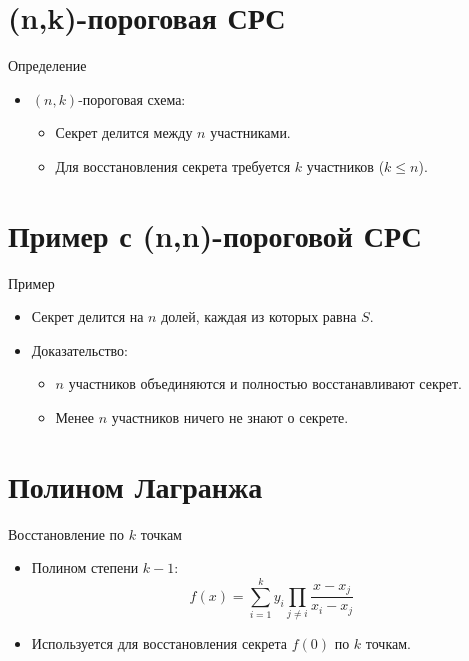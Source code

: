 \documentclass{beamer}
\begin{document}
\section{(n,k)-пороговая СРС}
\begin{frame}{Определение}
    \begin{itemize}
        \item \( (n, k) \)-пороговая схема:
        \begin{itemize}
            \item Секрет делится между \( n \) участниками.
            \item Для восстановления секрета требуется \( k \) участников (\( k \leq n \)).
        \end{itemize}
    \end{itemize}
\end{frame}

\section{Пример с (n,n)-пороговой СРС}
\begin{frame}{Пример}
    \begin{itemize}
        \item Секрет делится на \( n \) долей, каждая из которых равна \( S \).
        \item Доказательство:
        \begin{itemize}
            \item \( n \) участников объединяются и полностью восстанавливают секрет.
            \item Менее \( n \) участников ничего не знают о секрете.
        \end{itemize}
    \end{itemize}
\end{frame}

\section{Полином Лагранжа}
\begin{frame}{Восстановление по \( k \) точкам}
    \begin{itemize}
        \item Полином степени \( k-1 \):
        \[
        f(x) = \sum_{i=1}^{k} y_i \prod_{j \neq i} \frac{x - x_j}{x_i - x_j}
        \]
        \item Используется для восстановления секрета \( f(0) \) по \( k \) точкам.
    \end{itemize}
\end{frame}
\end{document}
